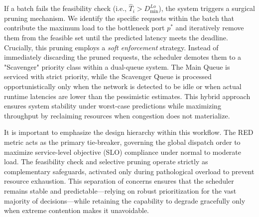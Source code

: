  If a batch fails the feasibility check (i.e., $\widehat{T}_i > D^{Lo}_{\min}$), the system triggers a surgical pruning mechanism. We identify the specific requests within the batch that contribute the maximum load to the bottleneck port $p^*$ and iteratively remove them from the feasible set until the predicted latency meets the deadline. Crucially, this pruning employs a \emph{soft enforcement} strategy. Instead of immediately discarding the pruned requests, the scheduler demotes them to a "Scavenger" priority class within a dual-queue system. The Main Queue is serviced with strict priority, while the Scavenger Queue is processed opportunistically only when the network is detected to be idle or when actual runtime latencies are lower than the pessimistic estimates. This hybrid approach ensures system stability under worst-case predictions while maximizing throughput by reclaiming resources when congestion does not materialize.

 It is important to emphasize the design hierarchy within this workflow. The RED metric acts as the primary tie-breaker, governing the global dispatch order to maximize service-level objective (SLO) compliance under normal to moderate load. The feasibility check and selective pruning operate strictly as complementary safeguards, activated only during pathological overload to prevent resource exhaustion. This separation of concerns ensures that the scheduler remains stable and predictable—relying on robust prioritization for the vast majority of decisions—while retaining the capability to degrade gracefully only when extreme contention makes it unavoidable.
